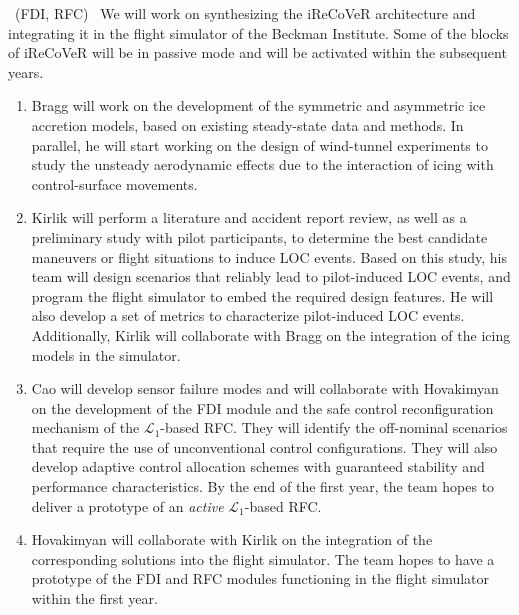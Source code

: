 \documentclass[letter,onecolumn,12pt]{aiaa-tc}
\newcommand{\Lone}{\mathcal{L}_1}
\let\origdescription\description
\renewenvironment{description}{
  \setlength{\leftmargini}{0mm}
  \origdescription
}
{\endlist}
\begin{document}
\begin{description}

  \item[Year I:] ~(FDI, RFC)~  We will work on synthesizing the iReCoVeR architecture and integrating it in the flight simulator of the Beckman Institute. Some of the blocks of iReCoVeR will be in passive mode and will be activated within the subsequent years.
         \begin{enumerate}
         \vspace{-2mm}
         \setlength{\itemsep}{-1pt}

          \item Bragg will work on the development of the symmetric and asymmetric ice accretion models, based on existing steady-state data and methods. In parallel, he will start working on the design of wind-tunnel experiments to study the unsteady aerodynamic effects due to the interaction of icing with control-surface movements.

          \item Kirlik will perform a literature and accident report review, as well as a preliminary study with pilot participants, to determine the best candidate maneuvers or flight situations to induce LOC events. Based on this study, his team will design scenarios that reliably lead to pilot-induced LOC events, and program the flight simulator to embed the required design features. He will also develop a set of metrics to characterize pilot-induced LOC events. Additionally, Kirlik will collaborate with Bragg on the integration of the icing models in the simulator.

          \item Cao will develop sensor failure modes and will collaborate with Hovakimyan on the development of the FDI module and the safe control reconfiguration mechanism of the $\Lone$-based RFC. They will identify the off-nominal scenarios that require the use of unconventional control configurations. They will also develop adaptive control allocation schemes with guaranteed stability and performance characteristics. By the end of the first year, the team hopes to deliver a prototype of an \emph{active} $\Lone$-based RFC.

          \item Hovakimyan will collaborate with  Kirlik on the integration of the corresponding solutions into the flight simulator. The team hopes to have a prototype of the FDI and RFC modules functioning in the flight simulator within the first year.


\end{enumerate}
\end{description}
\end{document}

